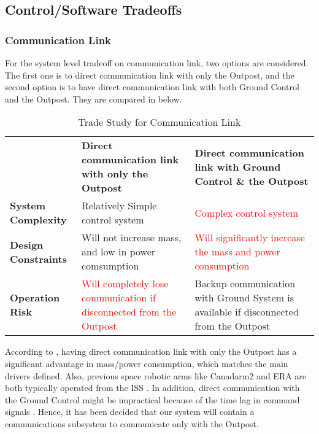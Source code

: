 \subsection{Control/Software Tradeoffs}
\subsubsection{Communication Link}
For the system level tradeoff on communication link, two options are considered. The first one is to direct communication link with only the Outpost, and the second option is to have direct communication link with both Ground Control and the Outpost. They are compared in  below.

\begin{table}[H]
\caption{Trade Study for Communication Link}
\begin{tabular}{|P{2.6cm}|P{6.3cm}|P{6.3cm}|}
\hline
	&	\textbf{Direct communication link with only the Outpost}	&	\textbf{Direct communication link with Ground Control \& the Outpost}	\\\hhline{|=|=|=|}
\textbf{System Complexity}	&	\textcolor{OliveGreen}{Relatively Simple control system}	&	\textcolor{red}{Complex control system}	\\\hline
\textbf{Design Constraints}	&	\textcolor{OliveGreen}{Will not increase mass, and low in power comsumption}	&	\textcolor{red}{Will significantly increase the mass and power consumption}	\\\hline
\textbf{Operation Risk}	&	\textcolor{red}{Will completely lose  communication if disconnected from the Outpost}	&	\textcolor{OliveGreen}{Backup communication with Ground System is available if disconnected from the Outpost}	\\\hline
\end{tabular}
\label{tab:communication}
\end{table}

According to , having direct communication link with only the Outpost has a significant advantage in mass/power consumption, which matches the main drivers defined. Also, previous space robotic arms like Canadarm2 and \gls{ERA} are both typically operated from the \gls{ISS} \cite{ca_era_communication}. In addition, direct communication with the Ground Control might be impractical because of the time lag in command signals \cite{roboserve}. Hence, it has been decided that our system will contain a communications subsystem to communicate only with the Outpost.
